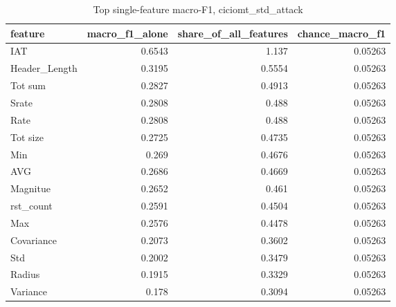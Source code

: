 \begin{table}
\caption{Top single-feature macro-F1, ciciomt_std_attack}
\begin{tabular}{lrrr}
\toprule
feature & macro_f1_alone & share_of_all_features & chance_macro_f1 \\
\midrule
IAT & 0.6543 & 1.137 & 0.05263 \\
Header_Length & 0.3195 & 0.5554 & 0.05263 \\
Tot sum & 0.2827 & 0.4913 & 0.05263 \\
Srate & 0.2808 & 0.488 & 0.05263 \\
Rate & 0.2808 & 0.488 & 0.05263 \\
Tot size & 0.2725 & 0.4735 & 0.05263 \\
Min & 0.269 & 0.4676 & 0.05263 \\
AVG & 0.2686 & 0.4669 & 0.05263 \\
Magnitue & 0.2652 & 0.461 & 0.05263 \\
rst_count & 0.2591 & 0.4504 & 0.05263 \\
Max & 0.2576 & 0.4478 & 0.05263 \\
Covariance & 0.2073 & 0.3602 & 0.05263 \\
Std & 0.2002 & 0.3479 & 0.05263 \\
Radius & 0.1915 & 0.3329 & 0.05263 \\
Variance & 0.178 & 0.3094 & 0.05263 \\
\bottomrule
\end{tabular}
\end{table}
